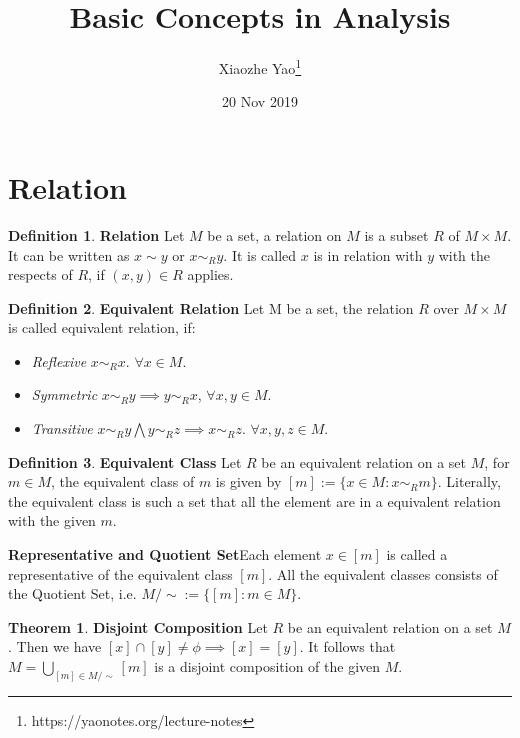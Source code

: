 \documentclass{article}
\title{Basic Concepts in Analysis}
\author{Xiaozhe Yao\footnote{https://yaonotes.org/lecture-notes}}
\date{20 Nov 2019}
\theoremstyle{definition}
\newtheorem{defi}{Definition}[section]
\newtheorem{theorem}{Theorem}[section]
\begin{document}
\maketitle
\section{Relation}

\begin{defi}
\textbf{Relation} Let $M$ be a set, a relation on $M$ is a subset $R$ of $M \times M$. It can be written as $x \sim y$ or $x\sim_{R}y$. It is called $x$ is in relation with $y$ with the respects of $R$, if $(x,y)\in R$ applies.
\end{defi}

\begin{defi}
\textbf{Equivalent Relation} Let M be a set, the relation $R$ over $M \times M$ is called equivalent relation, if: 
\begin{itemize}
    \item \textit{Reflexive} $x \sim_R x$. $\forall x\in M$.
    \item \textit{Symmetric} $x \sim_R y \implies y \sim_R x$, $\forall x, y \in M$.
    \item \textit{Transitive} $x \sim_R y \bigwedge y \sim_R z \implies x \sim_R z$. $\forall x, y, z \in M$.
\end{itemize}
\end{defi}

\begin{defi}
\textbf{Equivalent Class} Let $R$ be an equivalent relation on a set $M$, for $m \in M$, the equivalent class of $m$ is given by $[m] := \{x \in M: x\sim_R m\}$. Literally, the equivalent class is such a set that all the element are in a equivalent relation with the given $m$.

\textbf{Representative and Quotient Set}Each element $x \in [m]$ is called a representative of the equivalent class $[m]$. All the equivalent classes consists of the Quotient Set, i.e. $M / \sim := \{[m]: m\in M\}$.

\end{defi}

\begin{theorem}
\textbf{Disjoint Composition} Let $R$ be an equivalent relation on a set $M$. Then we have $[x] \cap [y] \neq \phi \implies [x]=[y]$. It follows that $M=\bigcup_{[m]\in M/\sim}[m]$ is a disjoint composition of the given $M$.
\end{theorem}
\end{document}
